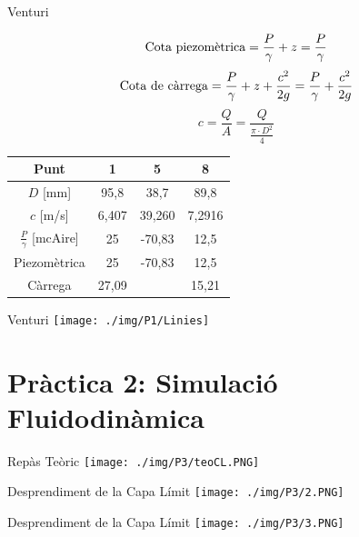 \documentclass[10pt]{beamer}
\begin{document}
\begin{frame}{Venturi}

$$\hbox{Cota piezomètrica} = \frac{P}{\gamma} + z = \frac{P}{\gamma} $$
$$ \hbox{Cota de càrrega} = \frac{P}{\gamma} + z + \frac{c^2}{2g} = \frac{P}{\gamma} + \frac{c^2}{2g}$$
$$c = \frac{Q}{A} = \frac{Q}{\frac{\pi \cdot D^2}{4}}$$
\begin{table}[h!]
\centering
\begin{tabular}{|c|c|c|c|}
\hline
Punt & 1 & 5 & 8 \\ [2pt]
\hline
$D$ [mm] & 95,8&38,7&89,8\\[2pt]
\hline
$c$ [m/s]& 6,407&39,260 & 7,2916\\[2pt]
\hline
$\frac{ P}{\gamma}$ [mcAire] & 25 & -70,83 & 12,5 \\ [2pt]
\hline
Piezomètrica & 25& -70,83 & 12,5\\[2pt]
\hline
Càrrega & 27,09 &&15,21\\[2pt]
\hline
\end{tabular}

\end{table}
\end{frame}

\begin{frame}{Venturi}
  \centering
  \texttt{[image: ./img/P1/Linies]}
\end{frame}













\begingroup
{}
\section{Pràctica 2: Simulació Fluidodinàmica}
\endgroup

  \begin{frame}{Repàs Teòric}
    \centering
    \texttt{[image: ./img/P3/teoCL.PNG]}
  \end{frame}

  \begin{frame}{Desprendiment de la Capa Límit }
    \centering
    \texttt{[image: ./img/P3/2.PNG]}
  \end{frame}

  \begin{frame}{Desprendiment de la Capa Límit }
    \centering
    \texttt{[image: ./img/P3/3.PNG]}
  \end{frame}
\end{document}
